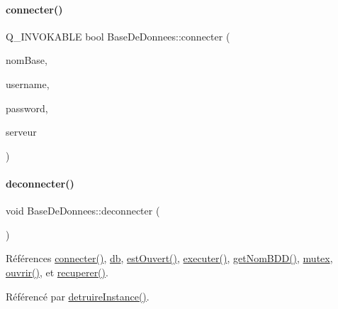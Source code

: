 \paragraph{\texorpdfstring{connecter()}{connecter()}\hspace{0.1cm}{\footnotesize\ttfamily [2/2]}}
{\footnotesize\ttfamily Q\+\_\+\+I\+N\+V\+O\+K\+A\+B\+LE bool Base\+De\+Donnees\+::connecter (\begin{DoxyParamCaption}\item[{Q\+String}]{nom\+Base,  }\item[{Q\+String}]{username,  }\item[{Q\+String}]{password,  }\item[{Q\+String}]{serveur }\end{DoxyParamCaption})}

\mbox{\label{class_base_de_donnees_ae780999d25a26a0e4dbe0706a4785978}} 
\paragraph{\texorpdfstring{deconnecter()}{deconnecter()}}
{\footnotesize\ttfamily void Base\+De\+Donnees\+::deconnecter (\begin{DoxyParamCaption}{ }\end{DoxyParamCaption})}



Références \hyperlink{class_base_de_donnees_ac20da193923a9bfea5e38ee5a54820cd}{connecter()}, \hyperlink{class_base_de_donnees_a3e738dcf443370c46a541677ab619f06}{db}, \hyperlink{class_base_de_donnees_af9ac332082ffd0dd35e412cefabe5e9c}{est\+Ouvert()}, \hyperlink{class_base_de_donnees_aa8de5f8f8bb17edc43f5c0ee33712081}{executer()}, \hyperlink{class_base_de_donnees_a467909531ae3cdebaf173f6e97cdc624}{get\+Nom\+B\+D\+D()}, \hyperlink{class_base_de_donnees_aa1b4696fac87a740f914aa73739086f2}{mutex}, \hyperlink{class_base_de_donnees_a7f6a5510b08017b0d99115a84252f186}{ouvrir()}, et \hyperlink{class_base_de_donnees_a77539baad389f5acf754cd2cd452403e}{recuperer()}.



Référencé par \hyperlink{class_base_de_donnees_a5002dc7324ab6f82c607e2423709b806}{detruire\+Instance()}.


